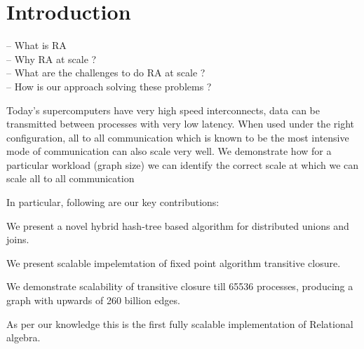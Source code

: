 

\section{Introduction}
\label{sec:intro}
%


-- What is RA \\
-- Why RA at scale ? \\
-- What are the challenges to do RA at scale ? \\
-- How is our approach solving these problems ?

Today's supercomputers have very high speed interconnects, data can be transmitted between processes with very low latency. 
When used under the right configuration, all to all communication which is known to be the most intensive mode of communication can also scale very well.
We demonstrate how for a particular workload (graph size) we can identify the correct scale at which we can scale all to all communication

In particular, following are our key contributions:
\begin{tightenumerate}
	\item We present a novel hybrid hash-tree based algorithm for distributed unions and joins.
	\item We present scalable impelemtation of fixed point algorithm transitive closure.
	\item We demonstrate scalability of transitive closure till 65536 processes, producing a graph with upwards of 260 billion edges. 
\end{tightenumerate}

As per our knowledge this is the first fully scalable implementation of Relational algebra.


